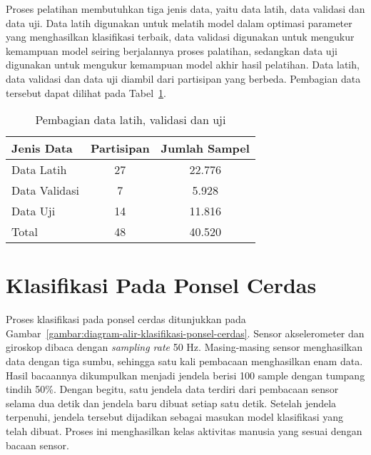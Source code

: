 Proses pelatihan membutuhkan tiga jenis data, yaitu data latih, data validasi dan data uji. Data latih digunakan untuk melatih model dalam optimasi parameter yang menghasilkan klasifikasi terbaik, data validasi digunakan untuk mengukur kemampuan model seiring berjalannya proses palatihan, sedangkan data uji digunakan untuk mengukur kemampuan model akhir hasil pelatihan. Data latih, data validasi dan data uji diambil dari partisipan yang berbeda. Pembagian data tersebut dapat dilihat pada Tabel~\ref{table:pembagian-data}.

\begin{table}[h!]
    \centering
    \caption{Pembagian data latih, validasi dan uji}
    \begin{tabular}{ |l|c|c| }
        \hline
        Jenis Data & Partisipan & Jumlah Sampel \\

        \hline
        Data Latih & 27 & 22.776 \\

        \hline
        Data Validasi & 7 & 5.928 \\

        \hline
        Data Uji & 14 & 11.816 \\

        \hline
        Total & 48 & 40.520 \\

        \hline
    \end{tabular}
    \label{table:pembagian-data}
\end{table}

\section{Klasifikasi Pada Ponsel Cerdas}
Proses klasifikasi pada ponsel cerdas ditunjukkan pada Gambar~\ref{gambar:diagram-alir-klasifikasi-ponsel-cerdas}. Sensor akselerometer dan giroskop dibaca dengan \textit{sampling rate} 50 Hz. Masing-masing sensor menghasilkan data dengan tiga sumbu, sehingga satu kali pembacaan menghasilkan enam data. Hasil bacaannya dikumpulkan menjadi jendela berisi 100 sample dengan tumpang tindih 50\%. Dengan begitu, satu jendela data terdiri dari pembacaan sensor selama dua detik dan jendela baru dibuat setiap satu detik. Setelah jendela terpenuhi, jendela tersebut dijadikan sebagai masukan model klasifikasi yang telah dibuat. Proses ini menghasilkan kelas aktivitas manusia yang sesuai dengan bacaan sensor.

